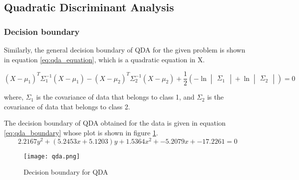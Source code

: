 \documentclass{article}
\begin{document}
\subsection{Quadratic Discriminant Analysis}
\subsubsection{Decision boundary}
Similarly, the general decision boundary of QDA for the given problem is shown in equation \ref{eq:qda_equation}, which is a quadratic equation in X.

\begin{equation}
    \label{eq:qda_equation}
    (X-\mu_{1})^{T}\Sigma^{-1}_{1}(X - \mu_{1}) - (X-\mu_{2})^{T}\Sigma^{-1}_{2}(X - \mu_{2})
    + \frac{1}{2}(-\ln{\begin{vmatrix}\Sigma_{1}\end{vmatrix}} + \ln{\begin{vmatrix}\Sigma_{2}\end{vmatrix}})= 0
\end{equation}

where, $\Sigma_{1}$ is the covariance of data that belongs to class 1, and $\Sigma_{2}$ is the covariance of data that belongs to class 2.

The decision boundary of QDA obtained for the data is given in equation \ref{eq:qda_boundary} whose plot is shown in figure \ref{fig:qda_decision_boundary}.
\begin{equation}
    \label{eq:qda_boundary}
    2.2167y^{2} + (5.2453x + 5.1203)y + 1.5364x^{2} + -5.2079x + -17.2261 = 0
\end{equation}

\begin{figure}[!ht]
  \texttt{[image: qda.png]}
  \caption{Decision boundary for QDA}
  \label{fig:qda_decision_boundary}
\end{figure}
\end{document}
